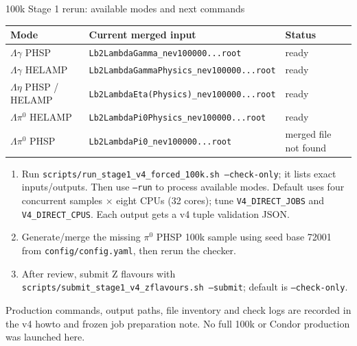 \documentclass[aspectratio=169,10pt]{beamer}
\begin{document}
\begin{frame}{100k Stage 1 rerun: available modes and next commands}
\small
\begin{tabular}{lll}
\toprule
Mode & Current merged input & Status\\
\midrule
$\Lambda\gamma$ PHSP & \texttt{Lb2LambdaGamma\_nev100000...root} & ready\\
$\Lambda\gamma$ HELAMP & \texttt{Lb2LambdaGammaPhysics\_nev100000...root} & ready\\
$\Lambda\eta$ PHSP / HELAMP & \texttt{Lb2LambdaEta(Physics)\_nev100000...root} & ready\\
$\Lambda\pi^0$ HELAMP & \texttt{Lb2LambdaPi0Physics\_nev100000...root} & ready\\
$\Lambda\pi^0$ PHSP & \texttt{Lb2LambdaPi0\_nev100000...root} & merged file not found\\
\bottomrule
\end{tabular}
\vspace{0.4cm}
\begin{enumerate}
\item Run \texttt{scripts/run\_stage1\_v4\_forced\_100k.sh --check-only}; it lists exact inputs/outputs. Then use \texttt{--run} to process available modes. Default uses four concurrent samples × eight CPUs (32 cores); tune \texttt{V4\_DIRECT\_JOBS} and \texttt{V4\_DIRECT\_CPUS}. Each output gets a v4 tuple validation JSON.
\item Generate/merge the missing $\pi^0$ PHSP 100k sample using seed base 72001 from \texttt{config/config.yaml}, then rerun the checker.
\item After review, submit Z flavours with \texttt{scripts/submit\_stage1\_v4\_zflavours.sh --submit}; default is \texttt{--check-only}.
\end{enumerate}
\tiny Production commands, output paths, file inventory and check logs are recorded in the v4 howto and frozen job preparation note. No full 100k or Condor production was launched here.
\end{frame}
\end{document}
